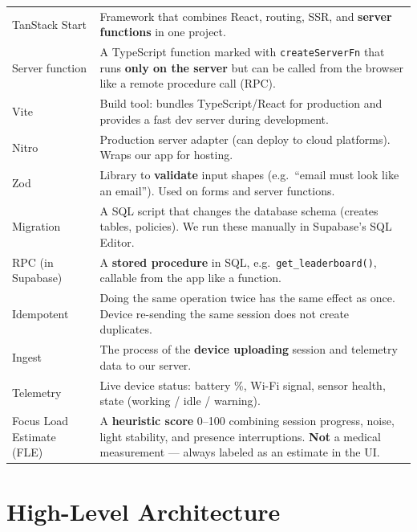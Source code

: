 \documentclass[11pt,a4paper]{article}
\begin{document}
\begin{longtable}{@{}p{3.2cm}p{10.5cm}@{}}
TanStack Start &
Framework that combines React, routing, SSR, and \textbf{server functions} in one project. \\

Server function &
A TypeScript function marked with \texttt{createServerFn} that runs \textbf{only on the server} but can be called from the browser like a remote procedure call (RPC). \\

Vite &
Build tool: bundles TypeScript/React for production and provides a fast dev server during development. \\

Nitro &
Production server adapter (can deploy to cloud platforms). Wraps our app for hosting. \\

Zod &
Library to \textbf{validate} input shapes (e.g.\ ``email must look like an email''). Used on forms and server functions. \\

Migration &
A SQL script that changes the database schema (creates tables, policies). We run these manually in Supabase's SQL Editor. \\

RPC (in Supabase) &
A \textbf{stored procedure} in SQL, e.g.\ \texttt{get\_leaderboard()}, callable from the app like a function. \\

Idempotent &
Doing the same operation twice has the same effect as once. Device re-sending the same session does not create duplicates. \\

Ingest &
The process of the \textbf{device uploading} session and telemetry data to our server. \\

Telemetry &
Live device status: battery \%, Wi-Fi signal, sensor health, state (working / idle / warning). \\

Focus Load Estimate (FLE) &
A \textbf{heuristic score} 0--100 combining session progress, noise, light stability, and presence interruptions. \textbf{Not} a medical measurement --- always labeled as an estimate in the UI. \\

\bottomrule
\end{longtable}

\section{High-Level Architecture}
\end{document}
